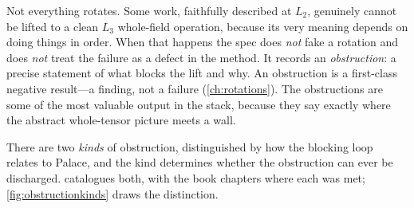 Not everything rotates. Some work, faithfully described at $L_2$, genuinely cannot be
lifted to a clean $L_3$ whole-field operation, because its very meaning depends on doing
things in order. When that happens the spec does \emph{not} fake a rotation and does
\emph{not} treat the failure as a defect in the method. It records an
\emph{obstruction}: a precise statement of what blocks the lift and why. An obstruction
is a first-class negative result---a finding, not a failure (\cref{ch:rotations}). The
obstructions are some of the most valuable output in the stack, because they say
exactly where the abstract whole-tensor picture meets a wall.

There are two \emph{kinds} of obstruction, distinguished by how the blocking loop
relates to Palace, and the kind determines whether the obstruction can ever be
discharged.  catalogues both, with the book chapters where each
was met; \cref{fig:obstructionkinds} draws the distinction.

